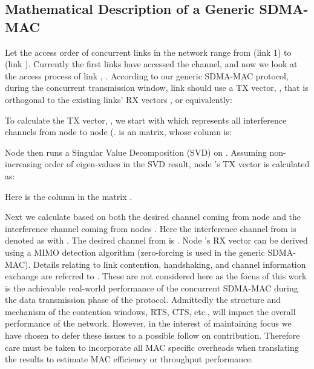 \documentclass[journal, final]{IEEEtran}
\begin{document}
\subsection{Mathematical Description of a Generic SDMA-MAC}
Let the access order of  concurrent links in the network range from  (link 1) to  (link ). Currently the first  links have
accessed the channel, and now we look at the access process of link ,
. According to our generic SDMA-MAC protocol, during the
concurrent transmission window, link  should use a TX vector, , that is orthogonal to the existing links' RX vectors
, or equivalently:


To calculate the TX vector, , we start with  which represents all interference channels
from node  to node (.  is an  matrix, whose
 column is:

Node  then runs a Singular Value Decomposition (SVD) on . Assuming non-increasing order of eigen-values in the SVD result, node 's TX vector is calculated as:

Here  is the  column in the
matrix .



Next we calculate  based on both the desired
channel coming from node  and the interference channel coming from
nodes . Here the interference channel from
 is denoted as  with . The desired
channel from  is . Node 's RX vector  can be derived using a MIMO detection algorithm
(zero-forcing is used in the generic SDMA-MAC). Details relating to link contention,
handshaking, and channel information exchange are referred to \cite{1_SPACEMAC, 2_MIMOMAN, 3_NULLHOC}. These
are not considered here as the focus of this work is the achievable
real-world performance of the concurrent SDMA-MAC during the data
transmission phase of the protocol. Admittedly the structure and mechanism
of the contention windows, RTS, CTS, etc., will impact the overall
performance of the network. However, in the interest of maintaining focus we have chosen to defer these issues to a possible follow on contribution.  Therefore care must be taken to incorporate all MAC specific overheads when translating the results to estimate MAC efficiency or throughput performance.
\end{document}
